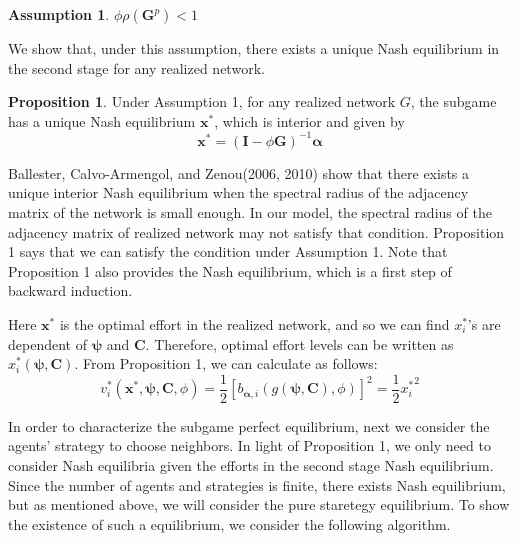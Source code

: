\documentclass[12pt]{article}
\theoremstyle{definition}
\newtheorem{proposition}{Proposition}
\newtheorem{assumption}{Assumption}
\begin{document}
\begin{assumption}
$\phi \rho(\bm{G}^p) < 1$
\end{assumption}

We show that, under this assumption, there exists a unique Nash equilibrium in the second stage for any realized network.

\begin{proposition}
Under Assumption 1, for any realized network $G$, the subgame has a unique Nash equilibrium $\bm{x}^*$, which is interior and given by
\[ \bm{x}^* = {(\bm{I} - \phi \bm{G})}^{-1} \bm{\alpha} \]
\end{proposition}

Ballester, Calvo-Armengol, and Zenou(2006, 2010) show that there exists a unique interior Nash equilibrium when the spectral radius of the adjacency matrix of the network is small enough.
In our model, the spectral radius of the adjacency matrix of realized network may not satisfy that condition.
Proposition 1 says that we can satisfy the condition under Assumption 1.
Note that Proposition 1 also provides the Nash equilibrium, which is a first step of backward induction.

Here $\bm{x}^*$ is the optimal effort in the realized network, and so we can find $x_i^*$'s are dependent of $\bm{\psi}$ and $\bm{C}$.
Therefore, optimal effort levels can be written as $x_i^*(\bm{\psi}, \bm{C})$.
From Proposition 1, we can calculate as follows:
\[ v_i^*(\bm{x}^*, \bm{\psi}, \bm{C}, \phi) = \frac{1}{2} {[b_{\bm{\alpha}, i}(g(\bm{\psi}, \bm{C}), \phi)]}^2 = \frac{1}{2} {x_i^*}^2 \]

In order to characterize the subgame perfect equilibrium, next we consider the agents' strategy to choose neighbors.
In light of Proposition 1, we only need to consider Nash equilibria given the efforts in the second stage Nash equilibrium.
Since the number of agents and strategies is finite, there exists Nash equilibrium, but as mentioned above, we will consider the pure staretegy equilibrium.
To show the existence of such a equilibrium, we consider the following algorithm.
\end{document}
